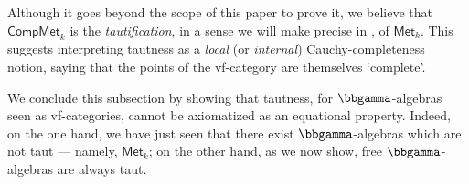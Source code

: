 \begin{rmk}
    Although it goes beyond the scope of this paper to prove it, we believe that $\mathsf{CompMet}_k$ is the \emph{tautification}, in a sense we will make precise in , of $\mathsf{Met}_k$.  This suggests interpreting tautness as a \emph{local} (or \emph{internal}) Cauchy-completeness notion, saying that the points of the vf-category are themselves `complete'. 
\end{rmk}

We conclude this subsection by showing that tautness, for $\bbgamma$-algebras seen as vf-categories, cannot be axiomatized as an equational property. Indeed, on the one hand, we have just seen that there exist $\bbgamma$-algebras which are not taut --- namely, $\mathsf{Met}_k$; on the other hand, as we now show, free $\bbgamma$-algebras are always taut.

